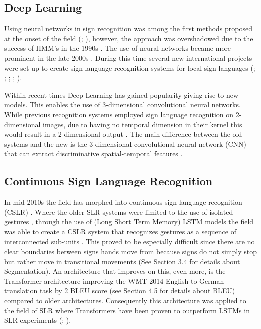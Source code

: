 \subsection{Deep Learning}

Using neural networks in sign recognition was among the first methods proposed at the onset of the field (\citealp{murakami1991gesture}; \citealp{fels1993glove}), however, the approach was overshadowed due to the success of HMM's in the 1990s \cite{cooper2011sign}. The use of neural networks became more prominent in the late 2000s \cite{parton2006sign}. During this time several new international projects were set up to create sign language recognition systems for local sign languages (\citealp{ethopia}; \citealp{malaysia}; \citealp{persia}; \citealp{brazil}; \citealp{arabia}).  

Within recent times Deep Learning \cite{lecun2015deep} has gained popularity giving rise to new models. This enables the use of 3-dimensional convolutional neural networks. While previous recognition systems employed sign language recognition on 2-dimensional images, due to having no temporal dimension in their kernel this would result in a 2-dimensional output \cite{tran2015learning}. The main difference between the old systems and the new is the 3-dimensional convolutional neural network (CNN) that can extract discriminative spatial-temporal features \cite{huang2015sign}.

\subsection{Continuous Sign Language Recognition}

In mid 2010s the field has morphed into continuous sign language recognition (CSLR) \cite{koller2015continuous}. Where the older SLR systems were limited to the use of isolated gestures \cite{cooper2011sign}, through the use of (Long Short Term Memory) LSTM models \cite{hochreiter1997long} the field was able to create a CSLR system that recognizes gestures as a sequence of interconnected sub-units \cite{mittal2019modified}. This proved to be especially difficult since there are no clear boundaries between signs hands move from because signs do not simply stop but rather move in transitional movements (See Section 3.4 for details about Segmentation). An architecture that improves on this, even more, is the Transformer architecture \cite{vaswani2017attention} improving the WMT 2014 English-to-German translation task by 2 BLEU score (see Section 4.5 for details about BLEU) compared to older architectures. Consequently this architecture was applied to the field of SLR where Transformers have been proven to outperform LSTMs in SLR experiments (\citealp{de2020sign}; \citealp{camgoz2020sign}).


